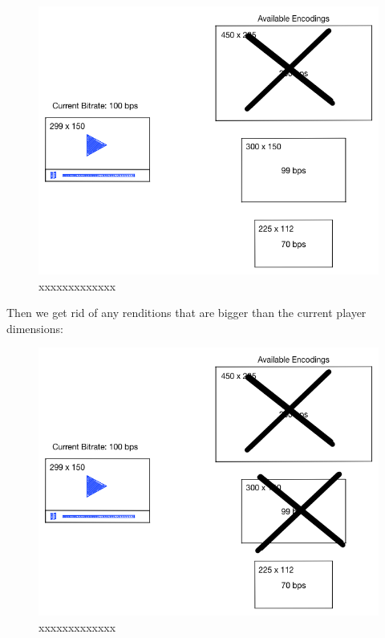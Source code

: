 \begin{figure}[htb] %
 \centering
 \includegraphics[width=1.0\linewidth]{images/chapter3/bitrate-switching-2.png}\hfill
 \caption[xxxxxxxxx]{xxxxxxxxxxxxx}
 \label{fig:fourV}
\end{figure}

Then we get rid of any renditions that are bigger than the current player dimensions:


\begin{figure}[htb] %
 \centering
 \includegraphics[width=1.0\linewidth]{images/chapter3/bitrate-switching-3.png}\hfill
 \caption[xxxxxxxxx]{xxxxxxxxxxxxx}
 \label{fig:fourV}
\end{figure}

